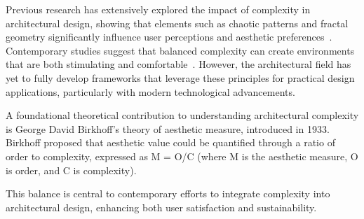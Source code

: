 

Previous research has extensively explored the impact of complexity in architectural design, showing that elements such as chaotic patterns and fractal geometry significantly influence user perceptions and aesthetic preferences~\cite{Bies2016}.
Contemporary studies suggest that balanced complexity can create environments that are both stimulating and comfortable~\cite{Redies2015}.
However, the architectural field has yet to fully develop frameworks that leverage these principles for practical design applications, particularly with modern technological advancements.

A foundational theoretical contribution to understanding architectural complexity is George David Birkhoff's theory of aesthetic measure, introduced in 1933.
Birkhoff proposed that aesthetic value could be quantified through a ratio of order to complexity, expressed as M = O/C (where M is the aesthetic measure, O is order, and C is complexity)\cite{Douchova2016}.

This balance is central to contemporary efforts to integrate complexity into architectural design, enhancing both user satisfaction and sustainability.


